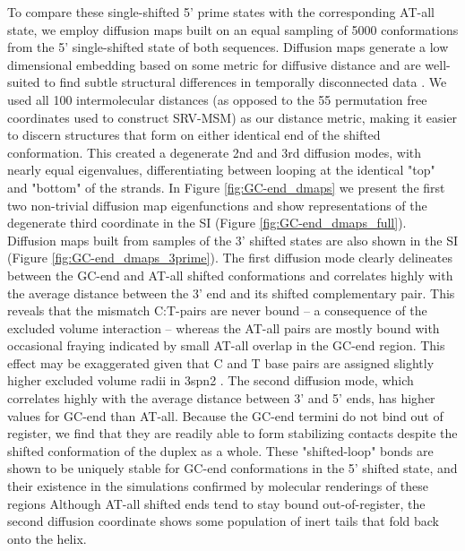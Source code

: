 \documentclass[journal=jpcbfk,manuscript=article]{achemso}
\begin{document}
To compare these single-shifted 5' prime states with the corresponding AT-all state, we employ diffusion maps built on an equal sampling of 5000 conformations from the 5' single-shifted state of both sequences. Diffusion maps generate a low dimensional embedding based on some metric for diffusive distance and are well-suited to find subtle structural differences in temporally disconnected data \citep{Coifman2006DiffusionMaps, Ferguson2010SystematicMaps}. We used all 100 intermolecular distances (as opposed to the 55 permutation free coordinates used to construct SRV-MSM) as our distance metric, making it easier to discern structures that form on either identical end of the shifted conformation. This created a degenerate 2nd and 3rd diffusion modes, with nearly equal eigenvalues, differentiating between looping at the identical "top" and "bottom" of the strands. In Figure \ref{fig:GC-end_dmaps} we present the first two non-trivial diffusion map eigenfunctions and show representations of the degenerate third coordinate in the SI (Figure \ref{fig:GC-end_dmaps_full}). Diffusion maps built from samples of the 3' shifted states are also shown in the SI (Figure \ref{fig:GC-end_dmaps_3prime}). The first diffusion mode clearly delineates between the GC-end and AT-all shifted conformations and correlates highly with the average distance between the 3' end and its shifted complementary pair. This reveals that the mismatch C:T-pairs are never bound -- a consequence of the excluded volume interaction -- whereas the AT-all pairs are mostly bound with occasional fraying indicated by small AT-all overlap in the GC-end region. This effect may be exaggerated given that C and T base pairs are assigned slightly higher excluded volume radii in 3spn2 \citep{Hinckley2013AnHybridization}. The second diffusion mode, which correlates highly with the average distance between 3' and 5' ends, has higher values for GC-end than AT-all. Because the GC-end termini do not bind out of register, we find that they are readily able to form stabilizing contacts despite the shifted conformation of the duplex as a whole. These "shifted-loop" bonds are shown to be uniquely stable for GC-end conformations in the 5' shifted state, and their existence in the simulations confirmed by molecular renderings of these regions Although AT-all shifted ends tend to stay bound out-of-register, the second diffusion coordinate shows some population of inert tails that fold back onto the helix.
\end{document}
